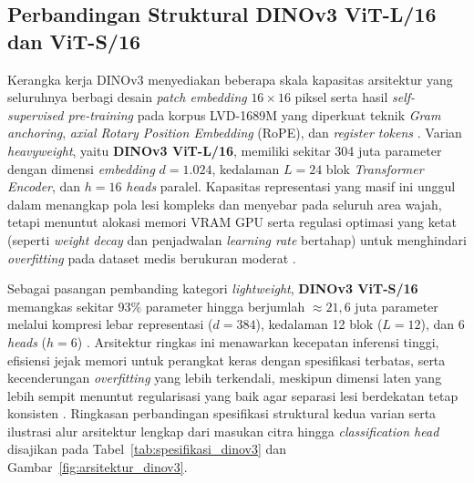 \subsection{Perbandingan Struktural DINOv3 ViT-L/16 dan ViT-S/16}
Kerangka kerja DINOv3 menyediakan beberapa skala kapasitas arsitektur yang seluruhnya berbagi desain \textit{patch embedding} $16 \times 16$ piksel serta hasil \textit{self-supervised pre-training} pada korpus LVD-1689M yang diperkuat teknik \textit{Gram anchoring}, \textit{axial Rotary Position Embedding} (RoPE), dan \textit{register tokens} \cite{simeoni2025dinov3}. Varian \textit{heavyweight}, yaitu \textbf{DINOv3 ViT-L/16}, memiliki sekitar 304 juta parameter dengan dimensi \textit{embedding} $d=1.024$, kedalaman $L=24$ blok \textit{Transformer Encoder}, dan $h=16$ \textit{heads} paralel. Kapasitas representasi yang masif ini unggul dalam menangkap pola lesi kompleks dan menyebar pada seluruh area wajah, tetapi menuntut alokasi memori VRAM GPU serta regulasi optimasi yang ketat (seperti \textit{weight decay} dan penjadwalan \textit{learning rate} bertahap) untuk menghindari \textit{overfitting} pada dataset medis berukuran moderat \cite{simeoni2025dinov3}.

Sebagai pasangan pembanding kategori \textit{lightweight}, \textbf{DINOv3 ViT-S/16} memangkas sekitar 93\% parameter hingga berjumlah $\approx 21,6$ juta parameter melalui kompresi lebar representasi ($d=384$), kedalaman 12 blok ($L=12$), dan 6 \textit{heads} ($h=6$) \cite{simeoni2025dinov3}. Arsitektur ringkas ini menawarkan kecepatan inferensi tinggi, efisiensi jejak memori untuk perangkat keras dengan spesifikasi terbatas, serta kecenderungan \textit{overfitting} yang lebih terkendali, meskipun dimensi laten yang lebih sempit menuntut regularisasi yang baik agar separasi lesi berdekatan tetap konsisten \cite{simeoni2025dinov3}. Ringkasan perbandingan spesifikasi struktural kedua varian serta ilustrasi alur arsitektur lengkap dari masukan citra hingga \textit{classification head} disajikan pada Tabel~\ref{tab:spesifikasi_dinov3} dan Gambar~\ref{fig:arsitektur_dinov3}.

